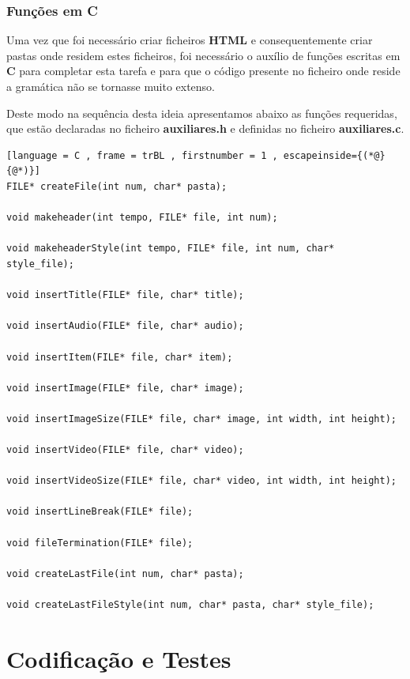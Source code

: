 \documentclass[11pt,a4paper]{report}
\begin{document}
\newpage

\subsection{Funções em C}

Uma vez que foi necessário criar ficheiros \textbf{HTML} e consequentemente criar pastas onde residem estes ficheiros, foi necessário o auxílio de funções escritas em \textbf{C} para completar esta tarefa e para que o código presente no ficheiro onde reside a gramática não se tornasse muito extenso.

Deste modo na sequência desta ideia apresentamos abaixo as funções requeridas, que estão declaradas no ficheiro \textbf{auxiliares.h} e definidas no ficheiro \textbf{auxiliares.c}.

\vspace{0.5cm}

\begin{lstlisting}[language = C , frame = trBL , firstnumber = 1 , escapeinside={(*@}{@*)}]
FILE* createFile(int num, char* pasta);

void makeheader(int tempo, FILE* file, int num);

void makeheaderStyle(int tempo, FILE* file, int num, char* style_file);

void insertTitle(FILE* file, char* title);

void insertAudio(FILE* file, char* audio);

void insertItem(FILE* file, char* item);

void insertImage(FILE* file, char* image);

void insertImageSize(FILE* file, char* image, int width, int height);

void insertVideo(FILE* file, char* video);

void insertVideoSize(FILE* file, char* video, int width, int height);

void insertLineBreak(FILE* file);

void fileTermination(FILE* file);

void createLastFile(int num, char* pasta);

void createLastFileStyle(int num, char* pasta, char* style_file);

\end{lstlisting}

\chapter{Codificação e Testes}
\label{chap:codificacao}
\end{document}
